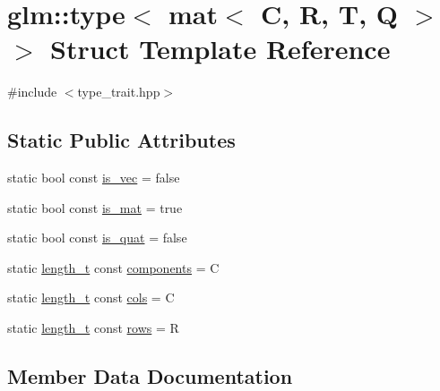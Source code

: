 \hypertarget{structglm_1_1type_3_01mat_3_01_c_00_01_r_00_01_t_00_01_q_01_4_01_4}{}\section{glm\+:\+:type$<$ mat$<$ C, R, T, Q $>$ $>$ Struct Template Reference}
\label{structglm_1_1type_3_01mat_3_01_c_00_01_r_00_01_t_00_01_q_01_4_01_4}


{\ttfamily \#include $<$type\+\_\+trait.\+hpp$>$}

\subsection*{Static Public Attributes}
\begin{DoxyCompactItemize}
\item 
static bool const \mbox{\hyperlink{structglm_1_1type_3_01mat_3_01_c_00_01_r_00_01_t_00_01_q_01_4_01_4_a6f4a616eae7863364fa05ed42d0d90c9}{is\+\_\+vec}} = false
\item 
static bool const \mbox{\hyperlink{structglm_1_1type_3_01mat_3_01_c_00_01_r_00_01_t_00_01_q_01_4_01_4_a8fb529c47b93fcd9c446bb960d6e1fc9}{is\+\_\+mat}} = true
\item 
static bool const \mbox{\hyperlink{structglm_1_1type_3_01mat_3_01_c_00_01_r_00_01_t_00_01_q_01_4_01_4_ab9f23373d46f9d066cd6274c79d0527f}{is\+\_\+quat}} = false
\item 
static \mbox{\hyperlink{namespaceglm_a090a0de2260835bee80e71a702492ed9}{length\+\_\+t}} const \mbox{\hyperlink{structglm_1_1type_3_01mat_3_01_c_00_01_r_00_01_t_00_01_q_01_4_01_4_a4f440364136d8fa3a62b2e1bfff81a01}{components}} = C
\item 
static \mbox{\hyperlink{namespaceglm_a090a0de2260835bee80e71a702492ed9}{length\+\_\+t}} const \mbox{\hyperlink{structglm_1_1type_3_01mat_3_01_c_00_01_r_00_01_t_00_01_q_01_4_01_4_a9be28abe8d17849b7a6cd499e8982996}{cols}} = C
\item 
static \mbox{\hyperlink{namespaceglm_a090a0de2260835bee80e71a702492ed9}{length\+\_\+t}} const \mbox{\hyperlink{structglm_1_1type_3_01mat_3_01_c_00_01_r_00_01_t_00_01_q_01_4_01_4_a638d8b45554f37be410a7275a744f875}{rows}} = R
\end{DoxyCompactItemize}


\subsection{Member Data Documentation}
\mbox{\label{structglm_1_1type_3_01mat_3_01_c_00_01_r_00_01_t_00_01_q_01_4_01_4_a9be28abe8d17849b7a6cd499e8982996}} 
